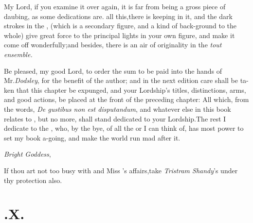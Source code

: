 \documentclass{article}
\begin{document}
My Lord, if you examine it over\break 
again, it is far from being a gross piece\break
of daubing, as some dedications are.\break
{} 
all this,\tsk there is keeping in it, and 
the dark strokes in the , (which is a secondary
figure, and a kind of back-ground to the whole) give great force to the
principal lights in your own figure, and make it come off
wonderfully;\tsk and besides, there is an air of originality in
the \textit{tout ensemble.}

Be pleased, my good Lord, to order the sum to be paid into the
hands of Mr.\break\textit{Dodsley}, for the benefit of the author; and in
the next edition care shall be ta-\break ken that this chapter be expunged,
and your Lordship’s titles, distinctions, arms, and good
actions, be placed at the front of the preceding chapter: All
which, from the words, \textit{De gustibus non est disputandum}, and
whatever else in this book relates to
, but no more, shall
stand dedicated to your Lordship.\tsk\break The rest I dedicate to the
, who, by the bye, of all the  or
 I can think of, has most power to set my
book a-going, and make the world run mad after it.

\vskip-6pt

\textit{Bright Goddess},

\vskip-6pt

If thou art not too busy with  and Miss
’s affairs,\tsk take \textit{Tri\-stram
Shandy}’s under thy protection also.

\vskip-6pt

\enlargethispage\baselineskip

\section{.\enspace X.}
\end{document}
